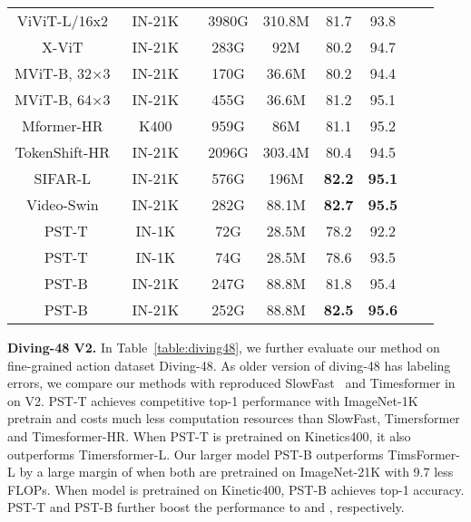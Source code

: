 \documentclass[runningheads]{llncs}
\begin{document}
\begin{table}[h]
\begin{center}
{\begin{tabular}{ccccccccc}
					ViViT-L/16x2~\cite{AnuragArnab2021ViViTAV} & IN-21K &  & 3980G & 310.8M & 81.7 & 93.8   \\
					X-ViT~\cite{bulat2021space} & IN-21K &  & 283G & 92M & 80.2  & 94.7  \\
					MViT-B, 32×3~\cite{Fan_2021_ICCV}  & IN-21K &  & 170G& 36.6M & 80.2  & 94.4   \\
					MViT-B, 64×3~\cite{Fan_2021_ICCV}  & IN-21K &  & 455G & 36.6M & 81.2  & 95.1   \\
					Mformer-HR~\cite{patrick2021keeping}  & K400 &  & 959G& 86M & 81.1  & 95.2   \\
					TokenShift-HR~\cite{HaoZhang2021TokenST} & IN-21K &  & 2096G & 303.4M &  80.4 & 94.5   \\
					SIFAR-L~\cite{SIFAR}  & IN-21K &  &  576G& 196M &  \textbf{82.2} & \textbf{95.1}   \\	
					Video-Swin~\cite{ZeLiu2021VideoST}  & IN-21K &  & 282G& 88.1M &  \textbf{82.7} & \textbf{95.5}  \\	
					\hline
					
					\multirow{1}{*}{PST-T} & IN-1K &  & 72G & \multirow{1}{*}{28.5M}  & 78.2 & 92.2  \\
					\multirow{1}{*}{PST-T} & IN-1K &  & 74G& \multirow{1}{*}{28.5M}  & 78.6 & 93.5  \\
					
					\multirow{1}{*}{PST-B} & IN-21K &  & 247G& \multirow{1}{*}{88.8M} &  81.8 & 95.4  \\
					\multirow{1}{*}{PST-B} & IN-21K &  & 252G & \multirow{1}{*}{88.8M} &  \textbf{82.5} & \textbf{95.6}  \\
					
					
					\hline
					
					
				\end{tabular}
			}
		\end{center}
		
	\end{table}
	
	
	\textbf{Diving-48 V2.} In Table~\ref{table:diving48}, we further evaluate our method on fine-grained action dataset Diving-48. As older version of diving-48 has labeling errors, we compare our methods with reproduced SlowFast~\cite{feichtenhofer2019slowfast} and Timesformer in~\cite{GedasBertasius2021IsSA} on V2. PST-T achieves competitive  top-1 performance with ImageNet-1K pretrain and costs much less computation resources than SlowFast, Timersformer and Timesformer-HR. When PST-T is pretrained on Kinetics400, it also outperforms Timersformer-L. Our larger model PST-B outperforms TimsFormer-L by a large margin of  when both are pretrained on ImageNet-21K with 9.7 less FLOPs. When model is pretrained on Kinetic400, PST-B achieves  top-1 accuracy. PST-T and PST-B further boost the performance to  and , respectively. 
	
\end{document}
